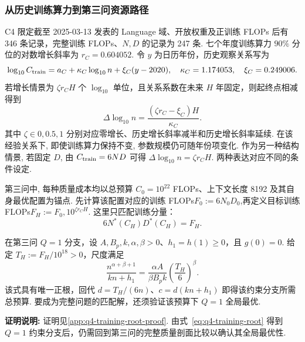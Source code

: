 \subsubsection{从历史训练算力到第三问资源路径}
C4 限定截至 2025-03-13 发表的 Language 域、开放权重及正训练 FLOPs 后有 346 条记录，完整训练 FLOPs、$N,D$ 的记录为 247 条. 七个年度训练算力 $90\%$ 分位的对数增长斜率为 $r_C=0.604052$. 令 $y$ 为日历年份，历史观察关系写为
\begin{equation}\label{eq:q4-compute-v8}
\log_{10}C_{\rm train}=a_C+\kappa_C\log_{10}n+\xi_C(y-2020),
\quad \kappa_C=1.174053,\quad\xi_C=0.249006.
\end{equation}
若增长情景为 $\zeta r_C H$ 个 $\log_{10}$ 单位，且关系系数在未来 $H$ 年固定，则起终点相减得到
\begin{equation}\label{eq:q4-empirical-increment}
\Delta\log_{10}n=\frac{(\zeta r_C-\xi_C)H}{\kappa_C}.
\end{equation}
其中 $\zeta\in{0,0.5,1}$ 分别对应零增长、历史增长斜率减半和历史增长斜率延续. 在该经验关系下, 即使训练算力保持不变, 参数规模仍可随年份项变化. 作为另一种结构情景, 若固定 $D$, 由 $C_{\rm train}=6ND$ 可得
$\Delta\log_{10}n=\zeta r_C H$.
两种表达对应不同的条件设定.

第三问中, 每种质量成本均以总预算 $C_0=10^{22}$ FLOPs、上下文长度 8192 及其自身最优配置为锚点. 先计算该配置对应的训练 FLOPs$F_0:=6N_0D_0$,再定义目标训练 FLOPs$F_H:=F_0,10^{\zeta r_C H}$. 这里只匹配训练分量：
\begin{equation}\label{eq:q4-training-match-v8}
6N^*(C_H)D^*(C_H)=F_H.
\end{equation}

\begin{lemma}\label{prop:q4-training-root}
在第三问 $Q=1$ 分支，设 $A,B_p,k,\alpha,\beta>0$、$h_1=h(1)\ge0$，且 $g(0)=0$. 给定 $T_H:=F_H/10^{18}>0$，尺度满足
\begin{equation}\label{eq:q4-training-root}
\frac{n^{\alpha+\beta+1}}{kn+h_1}
=\frac{\alpha A}{\beta B_pk}\left(\frac{T_H}{6}\right)^\beta.
\end{equation}
该式具有唯一正根，回代 $d=T_H/(6n)$、$c=d(kn+h_1)$ 即得该约束分支所需总预算. 要成为完整问题的匹配解，还须验证该预算下 $Q=1$ 全局最优. 
\end{lemma}
\textbf{证明说明:} 证明见\ref{app:q4-training-root-proof}. 
由式~\eqref{eq:q4-training-root} 得到 $Q=1$ 约束分支后，仍需回到第三问的完整质量剖面比较以确认其全局最优性.

